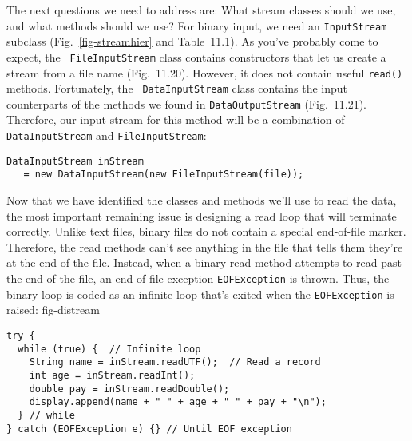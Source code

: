The next questions we need to address are: What stream classes should
we use, and what methods should we use?  For binary input, we need an
{\tt InputStream} subclass (Fig.~\ref{fig-streamhier} and
Table~11.1). As you've probably come to expect, the {\tt
FileInputStream} class contains constructors that let us create a
stream from a file name (Fig.~11\mbox{.}20). However, it does not
contain useful {\tt read()} methods.  Fortunately, the {\tt
DataInputStream} class contains the input counterparts of the methods
we found in {\tt DataOutput\-Stream} (Fig.~11.21). Therefore, our
input stream for this method will be a combination of {\tt
DataInputStream} and {\tt FileInputStream}:

\begin{jjjlisting}
\begin{lstlisting}
DataInputStream inStream
   = new DataInputStream(new FileInputStream(file));
\end{lstlisting}
\end{jjjlisting}

\noindent Now that we have identified the classes and methods we'll use 
to read the data, the most important remaining issue is designing a
read loop that will terminate correctly.  Unlike text files, binary
files do not contain a special end-of-file marker.  Therefore, the read
methods can't see anything in the file that tells them they're at the
end of the file.  Instead, when a binary read method attempts to read
past the
end of the file, an end-of-file exception {\tt EOFException} is
thrown.  Thus, the binary loop is coded as an infinite loop that's
exited when the {\tt EOFException} is raised:
 {fig-distream}


\begin{jjjlisting}
\begin{lstlisting}
try {
  while (true) {  // Infinite loop
    String name = inStream.readUTF();  // Read a record
    int age = inStream.readInt();
    double pay = inStream.readDouble();
    display.append(name + " " + age + " " + pay + "\n");
  } // while
} catch (EOFException e) {} // Until EOF exception
\end{lstlisting}
\end{jjjlisting}

